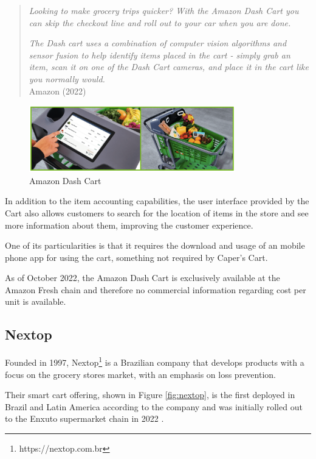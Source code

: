\documentclass[openright]{normas-utf-tex} %
\begin{document}
\begin{quote}
\textit{Looking to make grocery trips quicker? With the Amazon Dash Cart you can skip the checkout line and roll out to your car when you are done.}

\textit{The Dash cart uses a combination of computer vision algorithms and sensor fusion to help identify items placed in the cart - simply grab an item, scan it on one of the Dash Cart cameras, and place it in the cart like you normally would.}
\\
Amazon (2022)
\end{quote}

\begin{figure}[H]
	\centering
	\includegraphics[width=0.8\textwidth]{./images/dashcart.png}
    \caption[Amazon Dash Cart]{Amazon Dash Cart}
    \label{fig:dashcart}
\end{figure}

In addition to the item accounting capabilities, the user interface provided by
the Cart also allows customers to search for the location of items  in the
store and see more information about them, improving the customer experience.

One of its particularities is that it requires the download and usage of an mobile phone
app for using the cart, something not required by Caper's Cart.

As of October 2022, the Amazon Dash Cart is exclusively available at the Amazon
Fresh chain and therefore no commercial information regarding cost per unit is
available.

\subsection{Nextop}

Founded in 1997, Nextop\footnote{https://nextop.com.br} is a Brazilian company
that develops products with a focus on the grocery stores market, with an emphasis on
loss prevention.

Their smart cart offering, shown in Figure \ref{fig:nextop}, is the first
deployed in Brazil and Latin America according to the company and was
initially rolled out to the Enxuto supermarket chain in 2022
\cite{Paraiba2022}.
\end{document}
